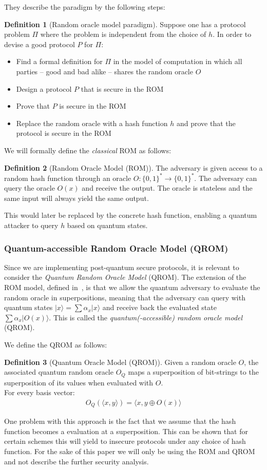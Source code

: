 \documentclass[11pt]{report}
\theoremstyle{definition}
\newtheorem{definition}{Definition}[section]
\theoremstyle{plain}
\begin{document}
They describe the paradigm by the following steps:
\begin{definition}[Random oracle model paradigm]
  Suppose one has a protocol problem $\Pi$ where the problem is independent from the choice of $h$. In order to devise a good protocol $P$ for $\Pi$:
  \begin{itemize}
    \item Find a formal definition for $\Pi$ in the model of computation in which all parties -- good and bad alike -- shares the random oracle $O$
    \item Design a protocol $P$ that is secure in the ROM
    \item Prove that $P$ is secure in the ROM
    \item Replace the random oracle with a hash function $h$ and prove that the protocol is secure in the ROM
  \end{itemize}
\end{definition}
We will formally define the \textit{classical} ROM as follows:
\begin{definition}[Random Oracle Model (ROM)]
  The adversary is given access to a random hash function through an oracle $O: \{0,1\}^* \rightarrow \{0,1\}^*$. The adversary can query the oracle $O(x)$ and receive the output. The oracle is stateless and the same input will always yield the same output.
\end{definition}
This would later be replaced by the concrete hash function, enabling a quantum attacker to query $h$ based on quantum states.

\subsubsection{Quantum-accessible Random Oracle Model (QROM)}\label{sub:qrom}
Since we are implementing post-quantum secure protocols, it is relevant to consider the \textit{Quantum Random Oracle Model} (QROM). The extension of the ROM model, defined in~\cite{boneh2011random}, is that we allow the quantum adversary to evaluate the random oracle in superpositions, meaning that the adversary can query with quantum states $|x \rangle = \sum \alpha_x |x \rangle$ and receive back the evaluated state $\sum\alpha_x |O(x)\rangle$. This is called the \textit{quantum(-accessible) random oracle model} (QROM).

We define the QROM as follows:
\begin{definition}[Quantum Oracle Model (QROM)]
  Given a random oracle $O$, the associated quantum random oracle $O_Q$ maps a superposition of bit-strings to the superposition of its values when evaluated with $O$.\\
  For every basis vector:
  \begin{align}
    O_Q(\langle x,y \rangle) = \langle x,y \oplus O(x) \rangle
  \end{align}
\end{definition}
One problem with this approach is the fact that we assume that the hash function becomes a evaluation at a superposition. This can be shown that for certain schemes this will yield to insecure protocols under any choice of hash function.
For the sake of this paper we will only be using the ROM and QROM and not describe the further security analysis.
\end{document}
